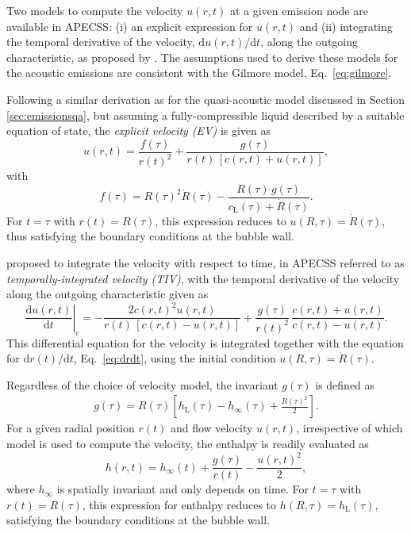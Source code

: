 Two models to compute the velocity $u(r,t)$ at a given emission node are available in APECSS: (i) an explicit expression for $u(r,t)$ \citep{Denner2023}  and (ii) integrating the temporal derivative of the velocity, $\mathrm{d}u(r,t)/\mathrm{d}t$, along the outgoing characteristic, as proposed by \citet{Hickling1963}. The assumptions used to derive these models for the acoustic emissions are consistent with the Gilmore model, Eq.~\eqref{eq:gilmore}.

Following a similar derivation as for the quasi-acoustic model discussed in Section \ref{sec:emissionsqa}, but assuming a fully-compressible liquid described by a suitable equation of state, the {\it explicit velocity (EV)} is given as
\begin{equation}
    u(r,t) = \frac{f(\tau)}{r(t)^2} + \frac{g(\tau)}{r(t) \, [c(r,t) + u(r,t)]} , \label{eq:u_rt}
\end{equation}
with 
\begin{equation}
    f(\tau) = R(\tau)^2 \dot{R}(\tau) - \frac{R(\tau) \, g(\tau)}{c_\mathrm{L}(\tau) + \dot{R}(\tau)}  . \label{eq:f_R}
\end{equation}
For $t=\tau$ with $r(t)=R(\tau)$, this expression reduces to $u(R,\tau)=\dot{R}(\tau)$, thus satisfying the boundary conditions at the bubble wall.

\citet{Hickling1963} proposed to integrate the velocity with respect to time, in APECSS referred to as {\it temporally-integrated velocity (TIV)}, with the temporal derivative of the velocity along the outgoing characteristic given as
\begin{equation}
    \left. \frac{\mathrm{d}u(r,t)}{\mathrm{d}t} \right|_\text{c} =  - \frac{2 c(r,t)^2 u(r,t)}{r(t) \, [c(r,t)-u(r,t)]} + \frac{g(\tau)}{r(t)^2} \, \frac{c(r,t)+u(r,t)}{c(r,t)-u(r,t)}. \label{eq:dudt_rt}
\end{equation}
This differential equation for the velocity is integrated together with the equation for ${\mathrm{d}r(t)/\mathrm{d}t}$, Eq.~\eqref{eq:drdt}, using the initial condition $u(R,\tau) = \dot{R}(\tau)$. 

Regardless of the choice of velocity model, the invariant $g(\tau)$ is defined as
\begin{align}
    g(\tau) = R(\tau) \left[h_\mathrm{L}(\tau) - h_\infty(\tau) + \frac{\dot{R}(\tau)^2}{2} \right]
    \label{eq:g_R} .
\end{align}
For a given radial position $r(t)$ and flow velocity $u(r,t)$, irrespective of which model is used to compute the velocity, the enthalpy is readily evaluated as
\begin{equation}
    h(r,t) = h_\infty(t) + \frac{g(\tau)}{r(t)} - \frac{u(r,t)^2}{2}, \label{eq:h_rt}
\end{equation}
where $h_\infty$ is spatially invariant and only depends on time. For $t=\tau$ with $r(t)=R(\tau)$, this expression for enthalpy reduces to $h(R,\tau)=h_\mathrm{L}(\tau)$, satisfying the boundary conditions at the bubble wall. 

